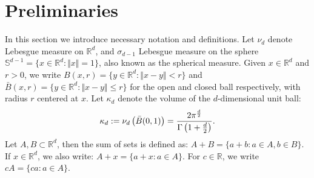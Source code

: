 \documentclass{article}
\newcommand{\RR}{\mathbb{R}}
\newcommand{\Sp}{\mathbb{S}}
\theoremstyle{plain}
\theoremstyle{remark}
\theoremstyle{definition}
\begin{document}

\section{Preliminaries}\label{reconstruction_preliminaries}
In this section we introduce necessary notation and definitions. Let $\nu_d$ denote Lebesgue measure on $\RR^d$, and $\sigma_{d-1}$ Lebesgue measure on the sphere $\Sp^{d-1} = \{x \in \RR^d: \Vert x \Vert = 1\}$, also known as the spherical measure. Given $x \in \RR^d$ and $r > 0$, we write $B(x, r) = \{y \in \RR^d : \Vert x-y\Vert < r\}$ and $\bar{B}(x, r) = \{y \in \RR^d : \Vert x-y\Vert \leq r\}$ for the open and closed ball respectively, with radius $r$ centered at $x$. Let $\kappa_d$ denote the volume of the $d$-dimensional unit ball:
\[\kappa_d := \nu_d\left(\Bar{B}(0,1)\right) = \frac{2\pi^\frac{d}{2}}{\Gamma\left(1 + \frac{d}{2} \right)}.\]
Let $A, B \subset \RR^d$, then the sum of sets is defined as: $A + B = \{a + b: a \in A, b \in B\}$. If $x \in \RR^d$, we also write: $A + x = \{a+x: a \in A\}$. For $c \in \RR$, we write $cA = \{ca:a\in A\}$.
\end{document}
